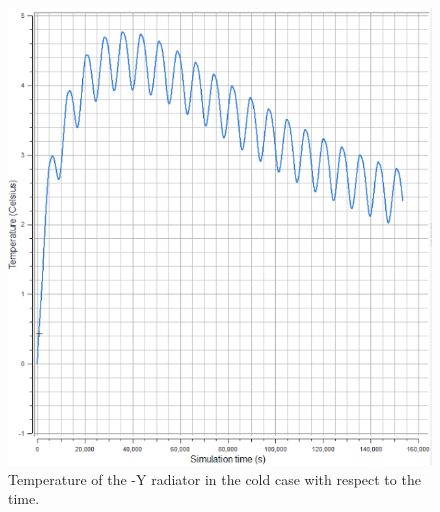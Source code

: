\documentclass[a4paper, oneside, 11pt]{article}
\begin{document}
\begin{figure}[!ht]
\begin{minipage}{8cm}
\includegraphics[scale=0.39]{NYcold}
\caption{Temperature of the -Y radiator in the cold case with respect to the time.}
\label{tempNYcold}
\end{minipage} 
\end{figure}
\end{document}
